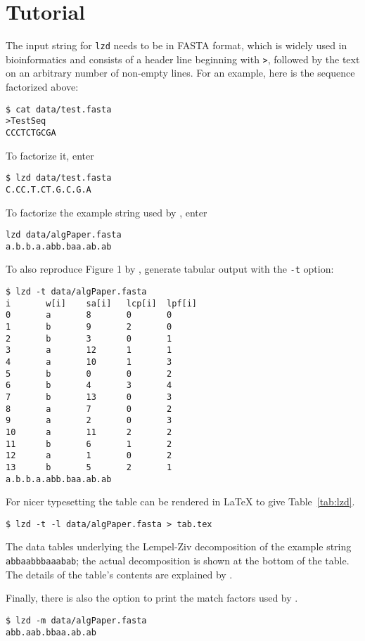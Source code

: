 \documentclass{article}
\newcommand{\ty}{\texttt}
\begin{document}
\section{Tutorial}
The input string for \ty{lzd} needs to be in FASTA format, which is
widely used in bioinformatics and consists of a header line beginning
with \verb+>+, followed by the text on an arbitrary
number of non-empty lines. For an example, here is the sequence
factorized above:
\begin{verbatim}
$ cat data/test.fasta
>TestSeq
CCCTCTGCGA
\end{verbatim}
To factorize it, enter
\begin{verbatim}
$ lzd data/test.fasta 
C.CC.T.CT.G.C.G.A
\end{verbatim}
To factorize the example string used by \citet{cro08:sim}, enter
\begin{verbatim}
lzd data/algPaper.fasta 
a.b.b.a.abb.baa.ab.ab
\end{verbatim}
To also reproduce Figure 1 by \citet{cro08:sim}, generate tabular
output with the \ty{-t} option:
\begin{verbatim}
$ lzd -t data/algPaper.fasta 
i       w[i]    sa[i]   lcp[i]  lpf[i]
0       a       8       0       0
1       b       9       2       0
2       b       3       0       1
3       a       12      1       1
4       a       10      1       3
5       b       0       0       2
6       b       4       3       4
7       b       13      0       3
8       a       7       0       2
9       a       2       0       3
10      a       11      2       2
11      b       6       1       2
12      a       1       0       2
13      b       5       2       1
a.b.b.a.abb.baa.ab.ab
\end{verbatim}
For nicer typesetting the table can be rendered in \LaTeX{} to give
Table~\ref{tab:lzd}.
\begin{verbatim}
$ lzd -t -l data/algPaper.fasta > tab.tex
\end{verbatim}
\begin{table}
  \caption{The data tables underlying the Lempel-Ziv decomposition of
    the example string \ty{abbaabbbaaabab}; the actual decomposition
    is shown at the bottom of the table. The details of the table's
    contents are explained by \citet{cro08:sim}.}\label{tab:lzd}
  \begin{center}
    
  \end{center}
\end{table}
Finally, there is also the option to print the match factors used by
\citet{pir19:hig}.
\begin{verbatim}
$ lzd -m data/algPaper.fasta
abb.aab.bbaa.ab.ab
\end{verbatim}
\end{document}
